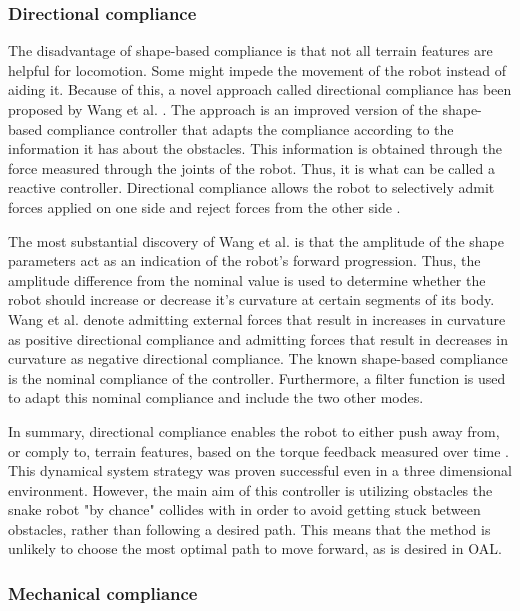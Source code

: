 \subsubsection{Directional compliance}

The disadvantage of shape-based compliance is that not all terrain features are helpful for locomotion. Some might impede the movement of the robot instead of aiding it. Because of this, a novel approach called directional compliance has been proposed by Wang et al. \cite{wang2020directional}. The approach is an improved version of the shape-based compliance controller that adapts the compliance according to the information it has about the obstacles. This information is obtained through the force measured through the joints of the robot. Thus, it is what can be called a reactive controller. Directional compliance allows the robot to selectively admit forces applied on one side and reject forces from the other side \cite{wang2020directional}.

The most substantial discovery of Wang et al. \cite{wang2020directional} is that the amplitude of the shape parameters act as an indication of the robot's forward progression. Thus, the amplitude difference from the nominal value is used to determine whether the robot should increase or decrease it's curvature at certain segments of its body. Wang et al. \cite{wang2020directional} denote admitting external forces that result in increases in curvature as positive directional compliance and admitting forces that result in decreases in curvature as negative directional compliance. The known shape-based compliance is the nominal compliance of the controller. Furthermore, a filter function is used to adapt this nominal compliance and include the two other modes.

In summary, directional compliance enables the robot to either push away from, or comply to, terrain features, based on the torque feedback measured over time \cite{wang2020directional}. This dynamical system strategy was proven successful even in a three dimensional environment. However, the main aim of this controller is utilizing obstacles the snake robot "by chance" collides with in order to avoid getting stuck between obstacles, rather than following a desired path. This means that the method is unlikely to choose the most optimal path to move forward, as is desired in OAL.


\subsubsection{Mechanical compliance}

